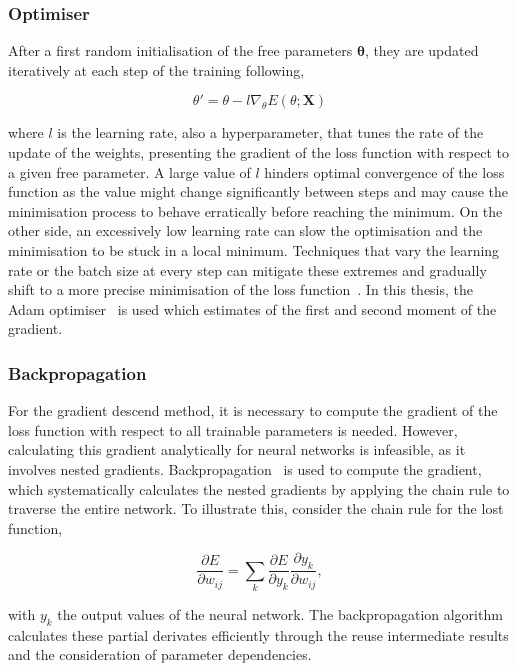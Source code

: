 \subsubsection{Optimiser}

After a first random initialisation of the free parameters $\boldsymbol{\theta}$, they are updated iteratively at each step of the training following,

\begin{equation}
    \theta' = \theta - l \nabla_\theta E(\theta;\mathbf{X})
\end{equation}

where $l$ is the learning rate, also a hyperparameter, that tunes the rate of the update of the weights, presenting the gradient of the loss function with respect to a given free parameter. A large value of $l$ hinders optimal convergence of the loss function as the value might change significantly between steps and may cause the minimisation process to behave erratically before reaching the minimum. On the other side, an excessively low learning rate can slow the optimisation and the minimisation to be stuck in a local minimum. Techniques that vary the learning rate or the batch size at every step can mitigate these extremes and gradually shift to a more precise minimisation of the loss function~\cite{LRBatchSize}. In this thesis, the Adam optimiser~\cite{Kingma2015AdamAM} is used which estimates of the first and second moment of the gradient.

\subsubsection{Backpropagation}

For the gradient descend method, it is necessary to compute the gradient of the loss function with respect to all trainable parameters is needed. However, calculating this gradient analytically for neural networks is infeasible, as it involves nested gradients. Backpropagation~\cite{Rumelhart1986} is used to compute the gradient, which systematically calculates the nested gradients by applying the chain rule to traverse the entire network. To illustrate this, consider the chain rule for the lost function,

\begin{equation}
    \frac{\partial E}{\partial w_{ij}} = \sum_k \frac{\partial E}{\partial y_k} \frac{\partial y_k}{\partial w_{ij}},
\end{equation}

with $y_k$ the output values of the neural network. The backpropagation algorithm calculates these partial derivates efficiently through the reuse intermediate results and the consideration of parameter dependencies. 

